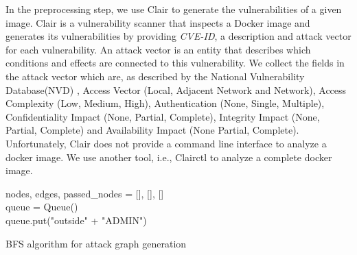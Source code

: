 In the preprocessing step, we use Clair to generate the vulnerabilities of a given image. Clair is a vulnerability scanner that inspects a Docker image and generates its vulnerabilities by providing \textit{CVE-ID}, a description and attack vector for each vulnerability. An attack vector is an entity that describes which conditions and effects are connected to this vulnerability. We collect the fields in the attack vector which are,  as described by the National Vulnerability Database(NVD) \cite{booth2013national}, Access Vector (Local, Adjacent Network and Network), Access Complexity (Low, Medium, High), Authentication (None, Single, Multiple), Confidentiality Impact (None, Partial, Complete), Integrity Impact (None, Partial, Complete) and Availability Impact (None Partial, Complete). Unfortunately, Clair does not provide a command line interface to analyze a docker image. We use another tool, i.e.,  Clairctl  to analyze a complete docker image.

\begin{algorithm}
	\SetAlgoLined
	nodes, edges, passed\_nodes = [], [], [] \\
	queue = Queue() \\
	queue.put("outside" + "ADMIN") \\
	
	
	\caption{BFS algorithm for attack graph generation}
	\label{BFSalgorithm}
\end{algorithm}

